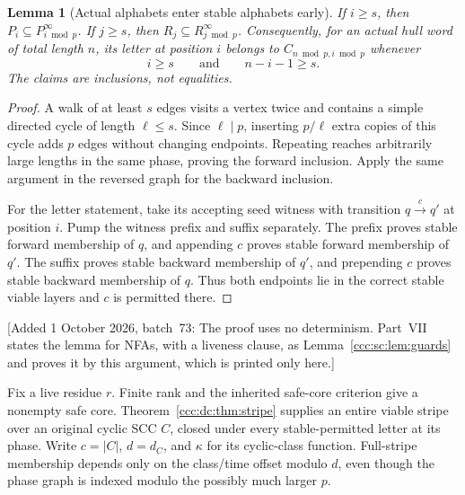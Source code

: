 \documentclass[11pt,letterpaper]{article}
\newtheorem{lemma}[theorem]{Lemma}
\theoremstyle{definition}
\theoremstyle{remark}
\newcommand{\waddsevthree}[1]{\textup{[}Added 1 October 2026, batch~73: #1\textup{]}}
\begin{document}
\begin{lemma}[Actual alphabets enter stable alphabets early]\label{ccc:dc:lem:early}
If $i\ge s$, then $P_i\subseteq P^\infty_{i\bmod p}$. If $j\ge s$, then $R_j\subseteq R^\infty_{j\bmod p}$. Consequently, for an actual hull word of total length $n$, its letter at position $i$ belongs to $C_{n\bmod p,i\bmod p}$ whenever
\[
i\ge s\qquad\text{and}\qquad n-i-1\ge s.
\]
The claims are inclusions, not equalities.
\end{lemma}
\begin{proof}
A walk of at least $s$ edges visits a vertex twice and contains a simple directed cycle of length $\ell\le s$. Since $\ell\mid p$, inserting $p/\ell$ extra copies of this cycle adds $p$ edges without changing endpoints. Repeating reaches arbitrarily large lengths in the same phase, proving the forward inclusion. Apply the same argument in the reversed graph for the backward inclusion.

For the letter statement, take its accepting seed witness with transition $q\mathrel{\mathop{\longrightarrow}\limits^c}q'$ at position $i$. Pump the witness prefix and suffix separately. The prefix proves stable forward membership of $q$, and appending $c$ proves stable forward membership of $q'$. The suffix proves stable backward membership of $q'$, and prepending $c$ proves stable backward membership of $q$. Thus both endpoints lie in the correct stable viable layers and $c$ is permitted there.
\end{proof}
\waddsevthree{The proof uses no determinism. Part~VII states the lemma for
NFAs, with a liveness clause, as Lemma~\ref{ccc:sc:lem:guards} and proves it
by this argument, which is printed only here.}

Fix a live residue $r$. Finite rank and the inherited safe-core criterion give a nonempty safe core. Theorem~\ref{ccc:dc:thm:stripe} supplies an entire viable stripe over an original cyclic SCC $C$, closed under every stable-permitted letter at its phase. Write $c=|C|$, $d=d_C$, and $\kappa$ for its cyclic-class function. Full-stripe membership depends only on the class/time offset modulo $d$, even though the phase graph is indexed modulo the possibly much larger $p$.
\end{document}
